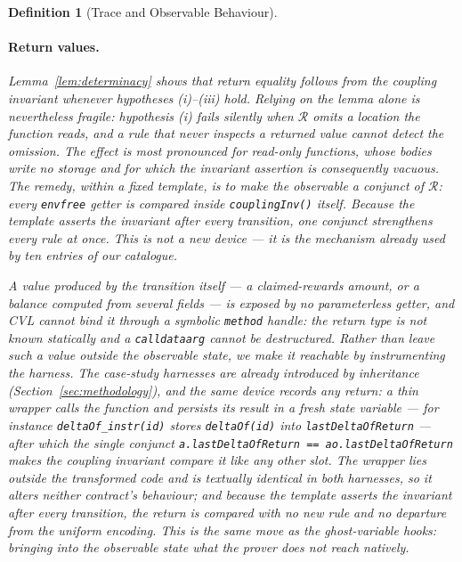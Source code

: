 \documentclass[manuscript,screen,review]{acmart}
\newenvironment{revisedblock}{\color{red}}{}
\newtheorem{definition}{Definition}
\begin{document}
\begin{definition}[Trace and Observable Behaviour]
\begin{revisedblock}
\paragraph{Return values.}
Lemma~\ref{lem:determinacy} shows that return equality \emph{follows} from the
coupling invariant whenever hypotheses (i)--(iii) hold. Relying on the lemma
alone is nevertheless fragile: hypothesis (i) fails silently when $\mathcal{R}$
omits a location the function reads, and a rule that never inspects a returned
value cannot detect the omission. The effect is most pronounced for read-only
functions, whose bodies write no storage and for which the invariant assertion
is consequently vacuous. The remedy, within a fixed template, is to make the
observable a conjunct of $\mathcal{R}$: every \texttt{envfree} getter is
compared inside \texttt{couplingInv()} itself. Because the template asserts the
invariant after \emph{every} transition, one conjunct strengthens every rule at
once. This is not a new device --- it is the mechanism already used by ten
entries of our catalogue.

A value produced by the transition itself --- a claimed-rewards amount, or a
balance computed from several fields --- is exposed by no parameterless getter,
and CVL cannot bind it through a symbolic \texttt{method} handle: the return type
is not known statically and a \texttt{calldataarg} cannot be destructured. Rather
than leave such a value outside the observable state, we make it reachable by
\emph{instrumenting the harness}. The case-study harnesses are already introduced
by inheritance (Section~\ref{sec:methodology}), and the same device records any
return: a thin wrapper calls the function and persists its result in a fresh
state variable --- for instance \texttt{deltaOf\_instr(id)} stores
\texttt{deltaOf(id)} into \texttt{lastDeltaOfReturn} --- after which the single
conjunct \texttt{a.lastDeltaOfReturn == ao.lastDeltaOfReturn} makes the coupling
invariant compare it like any other slot. The wrapper lies outside the
transformed code and is textually identical in both harnesses, so it alters
neither contract's behaviour; and because the template asserts the invariant
after every transition, the return is compared with no new rule and no departure
from the uniform encoding. This is the same move as the ghost-variable hooks:
bringing into the observable state what the prover does not reach natively.


\end{revisedblock}
\end{definition}
\end{document}
